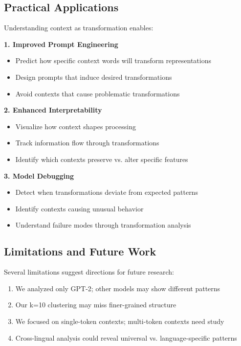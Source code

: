 \documentclass[11pt]{article}
\begin{document}
\subsection{Practical Applications}

Understanding context as transformation enables:

\textbf{1. Improved Prompt Engineering}
\begin{itemize}
\item Predict how specific context words will transform representations
\item Design prompts that induce desired transformations
\item Avoid contexts that cause problematic transformations
\end{itemize}

\textbf{2. Enhanced Interpretability}
\begin{itemize}
\item Visualize how context shapes processing
\item Track information flow through transformations
\item Identify which contexts preserve vs. alter specific features
\end{itemize}

\textbf{3. Model Debugging}
\begin{itemize}
\item Detect when transformations deviate from expected patterns
\item Identify contexts causing unusual behavior
\item Understand failure modes through transformation analysis
\end{itemize}

\subsection{Limitations and Future Work}

Several limitations suggest directions for future research:
\begin{enumerate}
\item We analyzed only GPT-2; other models may show different patterns
\item Our k=10 clustering may miss finer-grained structure
\item We focused on single-token contexts; multi-token contexts need study
\item Cross-lingual analysis could reveal universal vs. language-specific patterns
\end{enumerate}
\end{document}
